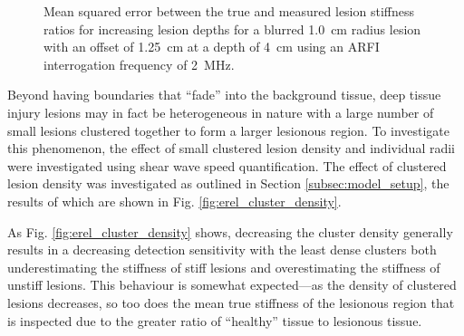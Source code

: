 			\begin{figure}[!htb]
				\centering
				\caption[Shear-wave speed quantified mean squared error related to lesion blurring]{Mean squared error between the true and measured lesion stiffness ratios for increasing lesion depths for a blurred \SI{1.0}{cm} radius lesion with an offset of \SI{1.25}{\cm} at a depth of \SI{4}{\cm} using an ARFI interrogation frequency of \SI{2}{\MHz}.}
				\label{fig:erel_blur_mse}
			\end{figure}

			Beyond having boundaries that ``fade'' into the background tissue, deep tissue injury lesions may in fact be heterogeneous in nature with a large number of small lesions clustered together to form a larger lesionous region. To investigate this phenomenon, the effect of small clustered lesion density and individual radii were investigated using shear wave speed quantification. The effect of clustered lesion density was investigated as outlined in Section \ref{subsec:model_setup}, the results of which are shown in Fig. \ref{fig:erel_cluster_density}.

			As Fig. \ref{fig:erel_cluster_density} shows, decreasing the cluster density generally results in a decreasing detection sensitivity with the least dense clusters both underestimating the stiffness of stiff lesions and overestimating the stiffness of unstiff lesions. This behaviour is somewhat expected---as the density of clustered lesions decreases, so too does the mean true stiffness of the lesionous region that is inspected due to the greater ratio of ``healthy'' tissue to lesionous tissue.

